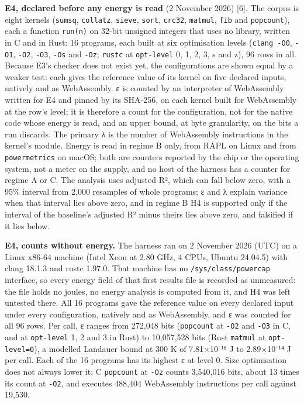 \documentclass[10pt,letterpaper]{article}
\begin{document}
\textbf{E4, declared before any energy is read} (2 November 2026)
{[}6{]}. The corpus is eight kernels (\texttt{sumsq}, \texttt{collatz},
\texttt{sieve}, \texttt{sort}, \texttt{crc32}, \texttt{matmul},
\texttt{fib} and \texttt{popcount}), each a function \texttt{run(n)} on
32-bit unsigned integers that uses no library, written in C and in Rust:
16 programs, each built at six optimisation levels (\texttt{clang\ -\allowbreak{}O0},
\texttt{-O1}, \texttt{-O2}, \texttt{-O3}, \texttt{-Os} and \texttt{-Oz};
\texttt{rustc} at \texttt{opt-level} 0, 1, 2, 3, s and z), 96 rows in
all. Because E3's checker does not exist yet, the configurations are
shown equal by a weaker test: each gives the reference value of its
kernel on five declared inputs, natively and as WebAssembly. ε is
counted by an interpreter of WebAssembly written for E4 and pinned by
its SHA-256, on each kernel built for WebAssembly at the row's level; it
is therefore a count for the configuration, not for the native code
whose energy is read, and an upper bound, at byte granularity, on the
bits a run discards. The primary λ is the number of WebAssembly
instructions in the kernel's module. Energy is read in regime B only,
from RAPL on Linux and from \texttt{powermetrics} on macOS; both are
counters reported by the chip or the operating system, not a meter on
the supply, and no host of the harness has a counter for regime A or C.
The analysis uses adjusted R², which can fall below zero, with a 95\%
interval from 2,000 resamples of whole programs; ε and λ explain
variance when that interval lies above zero, and in regime B H4 is
supported only if the interval of the baseline's adjusted R² minus
theirs lies above zero, and falsified if it lies below.

\textbf{E4, counts without energy.} The harness ran on 2 November 2026
(UTC) on a Linux x86-64 machine (Intel Xeon at 2.80 GHz, 4 CPUs, Ubuntu
24.04.5) with clang 18.1.3 and rustc 1.97.0. That machine has no
\texttt{/\allowbreak{}sys/\allowbreak{}class/\allowbreak{}powercap} interface, so every energy field of that
first results file is recorded as unmeasured: the file holds no joules,
no energy analysis is computed from it, and H4 was left untested there.
All 16 programs gave the reference value on every declared input under
every configuration, natively and as WebAssembly, and ε was counted for
all 96 rows. Per call, ε ranges from 272,048 bits (\texttt{popcount} at
\texttt{-O2} and \texttt{-O3} in C, and at \texttt{opt-level} 1, 2 and 3
in Rust) to 10,057,528 bits (Rust \texttt{matmul} at
\texttt{opt-\allowbreak{}level=0}), a modelled Landauer bound at 300 K of 7.81×10⁻¹⁶
J to 2.89×10⁻¹⁴ J per call. Each of the 16 programs has its highest ε at
level 0. Size optimisation does not always lower it: C \texttt{popcount}
at \texttt{-Oz} counts 3,540,016 bits, about 13 times its count at
\texttt{-O2}, and executes 488,404 WebAssembly instructions per call
against 19,530.
\end{document}
